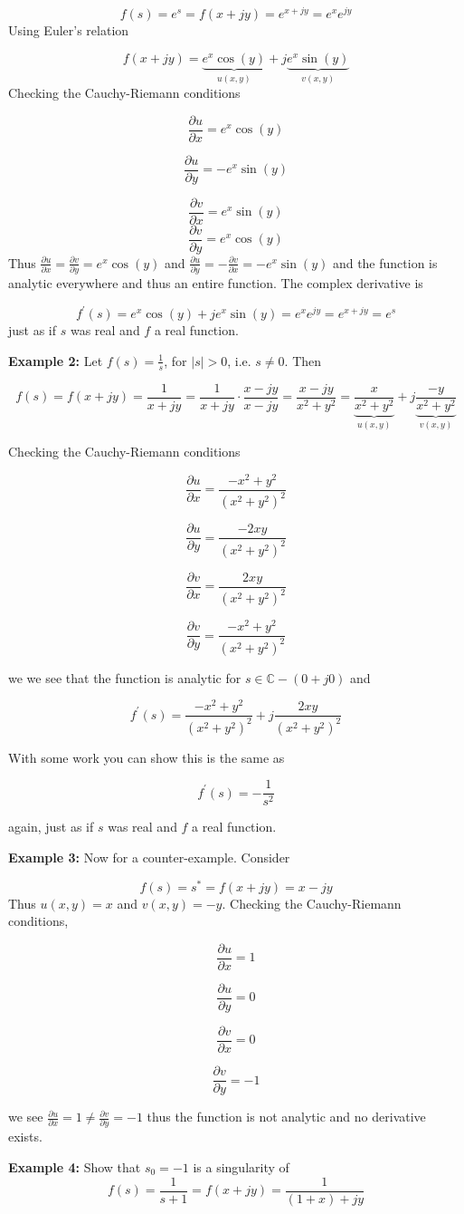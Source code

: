 \documentclass{article}
\begin{document}
\[
f(s) = e^s = f(x+jy) = e^{x+jy} = e^x e^{jy}
\]
Using Euler's relation

\[
f(x+jy) = \underbrace{e^x\cos(y)}_{u(x,y)} + j\underbrace{e^x \sin(y)}_{v(x,y)}
\]
Checking the Cauchy-Riemann conditions

\[
\frac{\partial u}{\partial x} = e^x\cos(y)
\]

\[
\frac{\partial u}{\partial y} = -e^x\sin(y)
\]

\[
\frac{\partial v}{\partial x} = e^x\sin(y)
\]
\[
\frac{\partial v}{\partial y} = e^x\cos(y)
\]
Thus $\frac{\partial u}{\partial x} = \frac{\partial v}{\partial y} = e^x\cos(y)$ and $\frac{\partial u}{\partial y} = -\frac{\partial v}{\partial x} = -e^x\sin(y)$ and the function is analytic everywhere and thus an entire function. The complex derivative is

\[
f^\prime(s) = e^x\cos(y) + je^x\sin(y) = e^x e^{jy} = e^{x+jy} = e^s
\]
just as if $s$ was real and $f$ a real function.

\textbf{Example 2:} Let $f(s) = \frac{1}{s}$, for $|s| > 0$, i.e. $s \neq 0$. Then

\[
f(s) = f(x+jy) = \frac{1}{x+jy} = \frac{1}{x+jy} \cdot \frac{x-jy}{x-jy} = \frac{x-jy}{x^2 + y^2} = \underbrace{\frac{x}{x^2 + y^2}}_{u(x,y)} + j \underbrace{\frac{-y}{x^2 + y^2}}_{v(x,y)}
\]

Checking the Cauchy-Riemann conditions

\[
\frac{\partial u}{\partial x} = \frac{-x^2 + y^2}{(x^2 + y^2)^2}
\]

\[
\frac{\partial u}{\partial y} = \frac{-2xy}{(x^2 + y^2)^2}
\]

\[
\frac{\partial v}{\partial x} = \frac{2xy}{(x^2 + y^2)^2}
\]

\[
\frac{\partial v}{\partial y} = \frac{-x^2 + y^2}{(x^2 + y^2)^2}
\]

we we see that the function is analytic for $s \in \mathbb{C} - (0 + j0)$ and

\[
f^\prime(s) = \frac{-x^2 + y^2}{(x^2 + y^2)^2} + j \frac{2xy}{(x^2 + y^2)^2}
\]

With some work you can show this is the same as

\[
f^\prime(s) = -\frac{1}{s^2}
\]

again, just as if $s$ was real and $f$ a real function.

\textbf{Example 3:} Now for a counter-example. Consider

\[
f(s) = s^* = f(x + jy) = x - jy
\]
Thus $u(x,y) = x$ and $v(x,y) = -y$. Checking the Cauchy-Riemann conditions,

\[
\frac{\partial u}{\partial x} = 1
\]

\[
\frac{\partial u}{\partial y} = 0
\]

\[
\frac{\partial v}{\partial x} = 0
\]

\[
\frac{\partial v}{\partial y} = -1
\]

we see $\frac{\partial u}{\partial x} = 1 \neq \frac{\partial v}{\partial y} = -1$ thus the function is not analytic and no derivative exists.

\textbf{Example 4:} Show that $s_0 = -1$ is a singularity of
\[
f(s) = \frac{1}{s+1} = f(x +jy) = \frac{1}{(1+x) + jy}
\]
\end{document}
